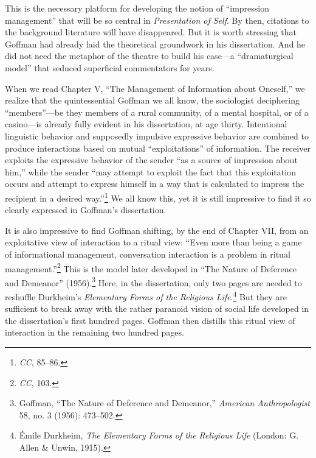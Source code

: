 \documentclass[twoside,symmetric,nobib,justified]{tufte-book}
\begin{document}
\noindent This is the necessary platform for developing the notion of ``impression
management'' that will be so central in \emph{Presentation of Self}. By
then, citations to the background literature will have disappeared. But
it is worth stressing that Goffman had already laid the theoretical
groundwork in his dissertation. And he did not need the metaphor of the
theatre to build his case---a ``dramaturgical model'' that seduced
superficial commentators for years.

When we read Chapter V, ``The Management of Information about Oneself,''
we realize that the quintessential Goffman we all know, the sociologist
deciphering ``members''---be they members of a rural community, of a
mental hospital, or of a casino---is already fully evident in his
dissertation, at age thirty. Intentional linguistic behavior and
supposedly impulsive expressive behavior are combined to produce
interactions based on mutual ``exploitations'' of information. The
receiver exploits the expressive behavior of the sender ``as a source of
impression about him,'' while the sender ``may attempt to exploit the
fact that this exploitation occurs and attempt to express himself in a
way that is calculated to impress the recipient in a desired
way.''\footnote{\emph{CC}, 85--86.} We all know this, yet it is still
impressive to find it so clearly expressed in Goffman's dissertation.

It is also impressive to find Goffman shifting, by the end of Chapter
VII, from an exploitative view of interaction to a ritual view: ``Even
more than being a game of informational management, conversation
interaction is a problem in ritual management.''\footnote{\emph{CC},
  103.} This is the model later developed in ``The Nature of Deference
and Demeanor'' (1956).\footnote{Goffman, ``The Nature of Deference and
  Demeanor,'' \emph{American Anthropologist} 58, no. 3 (1956): 473--502.}
Here, in the dissertation, only two pages are needed to reshuffle
Durkheim's \emph{Elementary Forms of the Religious Life}.\footnote{Émile
  Durkheim, \emph{The Elementary Forms of the Religious Life} (London:
  G. Allen \& Unwin, 1915).} But they are sufficient to break away with
the rather paranoid vision of social life developed in the
dissertation's first hundred pages. Goffman then distills this ritual
view of interaction in the remaining two hundred pages.
\end{document}
